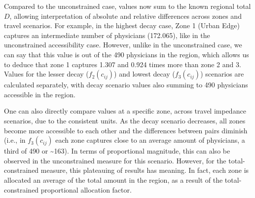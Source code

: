 \documentclass[
  10pt,
  letterpaper,
]{article}
\begin{document}
\begin{table}

\caption{\label{tbl-simple-example-total-opportunity-accessibility}Simple
system: total-constrained accessible opportunities.}


\end{table}%

Compared to the unconstrained case, values now sum to the known regional
total \(D\), allowing interpretation of absolute and relative
differences across zones and travel scenarios. For example, in the
highest decay case, Zone 1 (Urban Edge) captures an intermediate number
of physicians (172.065), like in the unconstrained accessibility case.
However, unlike in the unconstrained case, we can say that this value is
out of the 490 physicians in the region, which allows us to deduce that
zone 1 captures 1.307 and 0.924 times more than zone 2 and 3. Values for
the lesser decay (\(f_2(c_{ij})\)) and lowest decay (\(f_3(c_{ij})\))
scenarios are calculated separately, with decay scenario values also
summing to 490 physicians accessible in the region.

One can also directly compare values at a specific zone, across travel
impedance scenarios, due to the consistent units. As the decay scenario
decreases, all zones become more accessible to each other and the
differences between pairs diminish (i.e., in \(f_3(c_{ij})\) each zone
captures close to an average amount of physicians, a third of 490 or
\textasciitilde163). In terms of proportional magnitude, this can also
be observed in the unconstrained measure for this scenario. However, for
the total-constrained measure, this plateauing of results has meaning.
In fact, each zone is allocated an average of the total amount in the
region, as a result of the total-constrained proportional allocation
factor.
\end{document}
